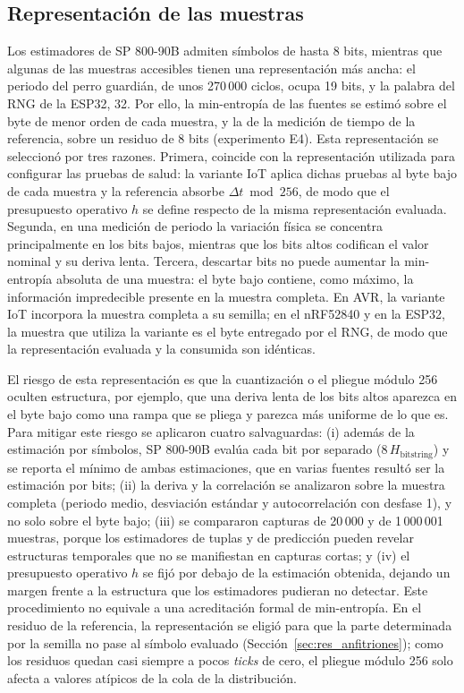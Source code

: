\subsection{Representación de las muestras}
\label{sec:representacion}

Los estimadores de SP 800-90B admiten símbolos de hasta 8 bits, mientras que algunas de las muestras accesibles tienen una representación más ancha: el periodo del perro guardián, de unos 270\,000 ciclos, ocupa 19 bits, y la palabra del RNG de la ESP32, 32. Por ello, la min-entropía de las fuentes se estimó sobre el byte de menor orden de cada muestra, y la de la medición de tiempo de la referencia, sobre un residuo de 8 bits (experimento E4). Esta representación se seleccionó por tres razones. Primera, coincide con la representación utilizada para configurar las pruebas de salud: la variante IoT aplica dichas pruebas al byte bajo de cada muestra y la referencia absorbe $\Delta t \bmod 256$, de modo que el presupuesto operativo $h$ se define respecto de la misma representación evaluada. Segunda, en una medición de periodo la variación física se concentra principalmente en los bits bajos, mientras que los bits altos codifican el valor nominal y su deriva lenta. Tercera, descartar bits no puede aumentar la min-entropía absoluta de una muestra: el byte bajo contiene, como máximo, la información impredecible presente en la muestra completa. En AVR, la variante IoT incorpora la muestra completa a su semilla; en el nRF52840 y en la ESP32, la muestra que utiliza la variante es el byte entregado por el RNG, de modo que la representación evaluada y la consumida son idénticas.

El riesgo de esta representación es que la cuantización o el pliegue módulo 256 oculten estructura, por ejemplo, que una deriva lenta de los bits altos aparezca en el byte bajo como una rampa que se pliega y parezca más uniforme de lo que es. Para mitigar este riesgo se aplicaron cuatro salvaguardas: (i) además de la estimación por símbolos, SP 800-90B evalúa cada bit por separado ($8\,H_{\text{bitstring}}$) y se reporta el mínimo de ambas estimaciones, que en varias fuentes resultó ser la estimación por bits; (ii) la deriva y la correlación se analizaron sobre la muestra completa (periodo medio, desviación estándar y autocorrelación con desfase 1), y no solo sobre el byte bajo; (iii) se compararon capturas de 20\,000 y de 1\,000\,001 muestras, porque los estimadores de tuplas y de predicción pueden revelar estructuras temporales que no se manifiestan en capturas cortas; y (iv) el presupuesto operativo $h$ se fijó por debajo de la estimación obtenida, dejando un margen frente a la estructura que los estimadores pudieran no detectar. Este procedimiento no equivale a una acreditación formal de min-entropía. En el residuo de la referencia, la representación se eligió para que la parte determinada por la semilla no pase al símbolo evaluado (Sección~\ref{sec:res_anfitriones}); como los residuos quedan casi siempre a pocos \textit{ticks} de cero, el pliegue módulo 256 solo afecta a valores atípicos de la cola de la distribución.

